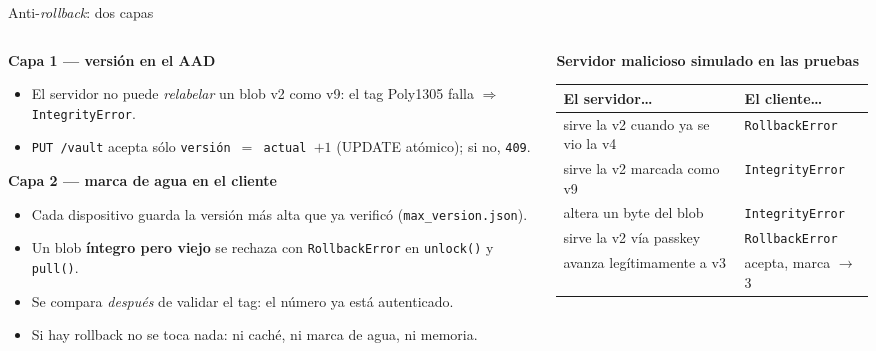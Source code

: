 \documentclass[aspectratio=169,10pt]{beamer}
\begin{document}
\begin{frame}{Anti-\emph{rollback}: dos capas}
  \begin{columns}[T]
    \begin{column}{0.5\textwidth}
      \small
      \textbf{Capa 1 — versión en el AAD}
      \begin{itemize}\footnotesize
        \item El servidor no puede \emph{relabelar} un blob v2 como v9: el tag Poly1305 falla
              $\Rightarrow$ \texttt{IntegrityError}.
        \item \texttt{PUT /vault} acepta sólo \texttt{versión $=$ actual $+1$}
              (UPDATE atómico); si no, \texttt{409}.
      \end{itemize}
      \vspace{2mm}
      \textbf{Capa 2 — marca de agua en el cliente}
      \begin{itemize}\footnotesize
        \item Cada dispositivo guarda la versión más alta que ya verificó
              (\texttt{max\_version.json}).
        \item Un blob \textbf{íntegro pero viejo} se rechaza con \texttt{RollbackError} en
              \texttt{unlock()} y \texttt{pull()}.
        \item Se compara \emph{después} de validar el tag: el número ya está autenticado.
        \item Si hay rollback no se toca nada: ni caché, ni marca de agua, ni memoria.
      \end{itemize}
    \end{column}
    \begin{column}{0.48\textwidth}
      \scriptsize
      \textbf{Servidor malicioso simulado en las pruebas}
      \vspace{1mm}

      \renewcommand{\arraystretch}{1.1}
      \begin{tabular}{@{}p{} p{}@{}}
        \toprule
        \textbf{El servidor\ldots} & \textbf{El cliente\ldots} \\
        \midrule
        sirve la v2 cuando ya se vio la v4 & \texttt{RollbackError} \\
        sirve la v2 marcada como v9 & \texttt{IntegrityError} \\
        altera un byte del blob & \texttt{IntegrityError} \\
        sirve la v2 vía passkey & \texttt{RollbackError} \\
        avanza legítimamente a v3 & acepta, marca $\to$ 3 \\
        \bottomrule
      \end{tabular}


\end{column}
\end{columns}
\end{frame}
\end{document}
